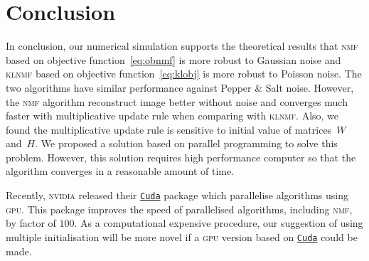 \section{Conclusion}
In conclusion, our numerical simulation supports the theoretical results that \textsc{nmf} based on objective function~\eqref{eq:obnmf} is more robust to Gaussian noise and \textsc{klnmf} based on objective function~\eqref{eq:klobj} is more robust to Poisson noise. The two algorithms have similar performance against Pepper \& Salt noise. However, the \textsc{nmf} algorithm reconstruct image better without noise and converges much faster with multiplicative update rule when comparing with \textsc{klnmf}. Also, we found the multiplicative update rule is sensitive to initial value of matrices~$W$ and~$H$. We proposed a solution based on parallel programming to solve this problem. However, this solution requires high performance computer so that the algorithm converges in a reasonable amount of time.

Recently, \textsc{nvidia} released their \href{https://developer.nvidia.com/cuda-zone}{\texttt{Cuda}} package which parallelise algorithms using \textsc{gpu}. This package improves the speed of parallelised algorithms, including \textsc{nmf}, by factor of $100$. As a computational expensive procedure, our suggestion of using multiple initialisation will be more novel if a \textsc{gpu} version based on \href{https://developer.nvidia.com/cuda-zone}{\texttt{Cuda}} could be made. 